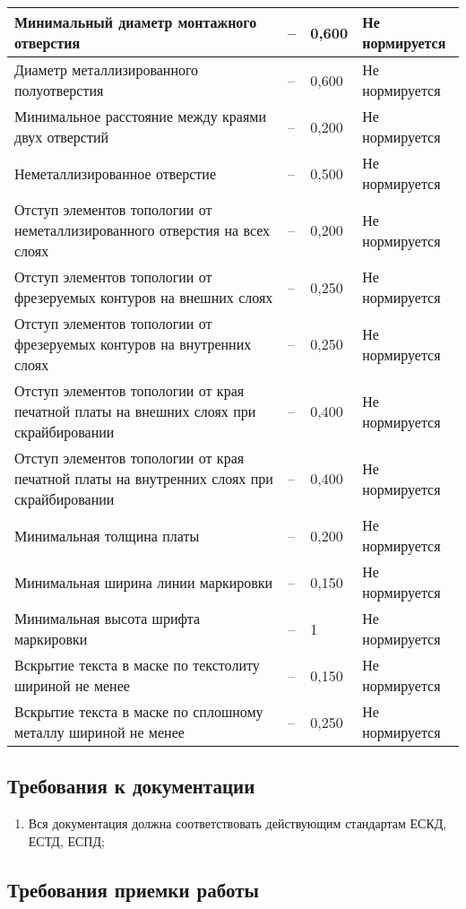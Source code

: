 \begin{longtable}{|p{5cm}|p{2cm}|p{3cm}|p{4cm}|}
Минимальный диаметр монтажного отверстия & -- & 0,600  & Не нормируется \\ \hline
Диаметр металлизированного полуотверстия & -- & 0,600  & Не нормируется \\ \hline
Минимальное расстояние между краями двух отверстий & -- & 0,200  & Не нормируется \\ \hline
Неметаллизированное отверстие & -- & 0,500  & Не нормируется \\ \hline
Отступ элементов топологии от неметаллизированного отверстия на всех слоях & -- & 0,200  & Не нормируется \\ \hline
Отступ элементов топологии от фрезеруемых контуров на внешних слоях & -- & 0,250  & Не нормируется \\ \hline
Отступ элементов топологии от фрезеруемых контуров на внутренних слоях & -- & 0,250  & Не нормируется \\ \hline
Отступ элементов топологии от края печатной платы на внешних слоях при скрайбировании & -- & 0,400  & Не нормируется \\ \hline
Отступ элементов топологии от края печатной платы на внутренних слоях при скрайбировании & -- & 0,400  & Не нормируется \\ \hline
Минимальная толщина платы & -- & 0,200  & Не нормируется \\ \hline
Минимальная ширина линии маркировки & -- & 0,150  & Не нормируется \\ \hline
Минимальная высота шрифта маркировки & -- & 1  & Не нормируется \\ \hline
Вскрытие текста в маске по текстолиту шириной не менее & -- & 0,150  & Не нормируется \\ \hline
Вскрытие текста в маске по сплошному металлу шириной не менее & -- & 0,250  & Не нормируется \\ \hline
\end{longtable}

\subsection{Требования к документации}


\begin{enumerate}
    \item Вся документация должна соответствовать действующим стандартам ЕСКД, ЕСТД, ЕСПД;
\end{enumerate}


\subsection{Требования приемки работы}

